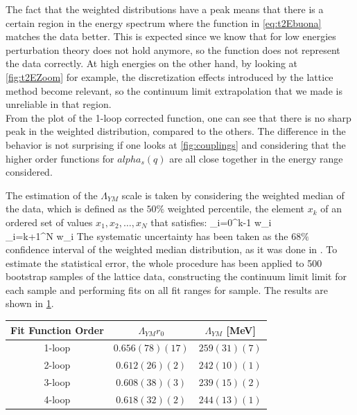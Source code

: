 The fact that the weighted distributions have a peak means that there is a certain region in the energy spectrum where the function in \cref{eq:t2Ebuona} matches the data better. This is expected since we know that for low energies perturbation theory does not hold anymore, so the function does not represent the data correctly. At high energies on the other hand, by looking at \cref{fig:t2EZoom} for example, the discretization effects introduced by the lattice method become relevant, so the continuum limit extrapolation that we made is unreliable in that region.\\
From the plot of the 1-loop corrected function, one can see that there is no sharp peak in the weighted distribution, compared to the others. The difference in the behavior is not surprising if one looks at \cref{fig:couplings} and considering that the higher order functions for $alpha_s(q)$ are all close together in the energy range considered. 

The estimation of the $\Lambda_{YM}$ scale is taken by considering the weighted median of the data, which is defined as the $50\%$ weighted percentile, the element $x_k$ of an ordered set of values $x_1, x_2, \dots, x_N$ that satisfies:
\beq
    \sum_{i=0}^{k-1} w_i \leq {} ~~~~   ~~~~~ \sum_{i=k+1}^{N} w_i \geq {}
\eeq
The systematic uncertainty has been taken as the $68\%$ confidence interval of the weighted median distribution, as it was done in \cite{durr_ab-initio_2008-1}. To estimate the statistical error, the whole procedure has been applied to 500 bootstrap samples of the lattice data, constructing the continuum limit limit for each sample and performing fits on all fit ranges for sample. The results are shown in \cref{lambda_table}.

\begin{table}[!htb]
    \begin{center}
    \begin{tabular}{ccc} 
        Fit Function Order & $\Lambda_{YM}r_0$ & $\Lambda_{YM}$ [MeV] \\\hline
        1-loop & $0.656(78)(17)$ & $259(31)(7)$ \\
        2-loop & $0.612(26)(2)$ & $242(10)(1)$  \\
        3-loop & $0.608(38)(3)$ & $239(15)(2)$  \\
        4-loop & $0.618(32)(2)$ & $244(13)(1)$  
    \end{tabular}
    \label{lambda_table} 
    \end{center}
\end{table}

